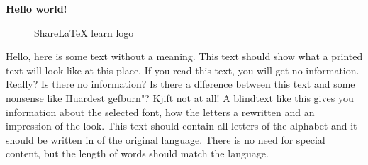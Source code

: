\documentclass[../main.tex]{subfiles}
\begin{document}
\textbf{Hello world!}

\begin{figure}[bh]
\centering

\label{fig:img1}
\caption{ShareLaTeX learn logo}
\end{figure}

Hello, here is some text without a meaning.  This text should show what a printed text will look like at this place.  If you read this text, you will get no information.  Really?  Is there no information?  Is there a diference between this text and some nonsense like Huardest gefburn"?  Kjift  not at all!  A blindtext like this gives you information about the selected font, how the letters a rewritten and an impression of the look.  This text should contain all letters of the alphabet and it should be written in of the original language.  There is no need for special content, but the length of words should match the language.
\end{document}
